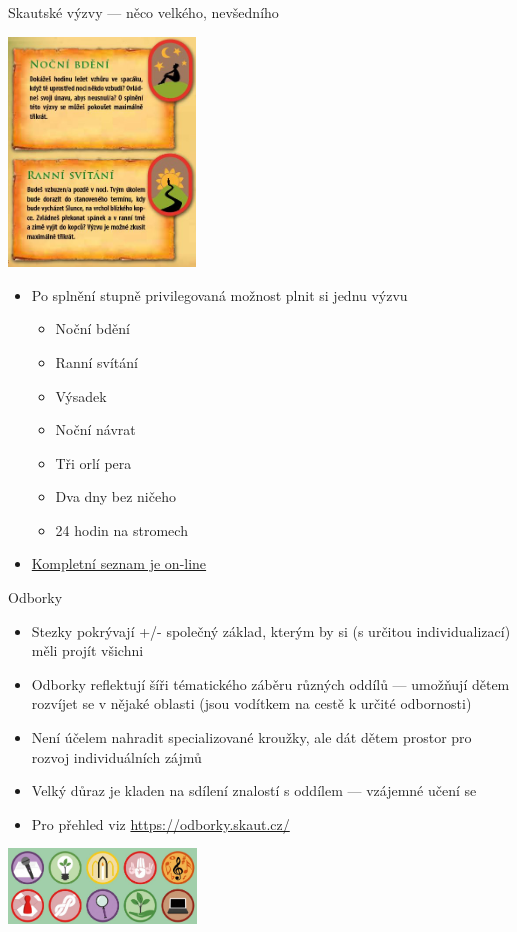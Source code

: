 \documentclass[compress, ucs, xelatex, xcolor=dvipsnames, print,
  hyperref={
    bookmarks=true,
    unicode=true,
    colorlinks=true,
    plainpages=false,
    pdfkeywords={Junak, Pedagogika, Skaut, Skauting, Vychovna metoda},
    linkcolor=Black,
    anchorcolor=Black,
    citecolor=OliveGreen,
    filecolor=OliveGreen,
    menucolor=Black,
    urlcolor=OliveGreen,
    pdftex}
  ]{beamer}
\begin{document}
\begin{frame}{Skautské výzvy --- něco velkého, nevšedního}
  \begin{multicols}{2}
    \includegraphics[height=6.1cm]{vyzvy.png}
    \begin{itemize}
      \item Po splnění stupně privilegovaná možnost plnit si jednu výzvu
      \begin{itemize}
	\item Noční bdění
	\item Ranní svítání
	\item Výsadek
	\item Noční návrat
	\item Tři orlí pera
	\item Dva dny bez ničeho
	\item 24 hodin na stromech
      \end{itemize}
      \item \href{https://krizovatka.skaut.cz/oddil/program/skautky-a-skauti/skauti-skautky-stezky/skauti-skautky-stezky-vyzvy}{Kompletní seznam je on-line}
    \end{itemize}
  \end{multicols}
\end{frame}

\begin{frame}{Odborky}
  \begin{itemize}
    \item Stezky pokrývají +/- společný základ, kterým by si (s určitou individualizací) měli projít všichni
    \item Odborky reflektují šíři tématického záběru různých oddílů --- umožňují dětem rozvíjet se v nějaké oblasti (jsou vodítkem na cestě k určité odbornosti)
    \item Není účelem nahradit specializované kroužky, ale dát dětem prostor pro rozvoj individuálních zájmů
    \item Velký důraz je kladen na sdílení znalostí s oddílem --- vzájemné učení se
    \item Pro přehled viz \url{https://odborky.skaut.cz/}
  \end{itemize}
  \begin{center}
    \includegraphics[height=2cm]{odborky.jpg}
  \end{center}
\end{frame}
\end{document}
